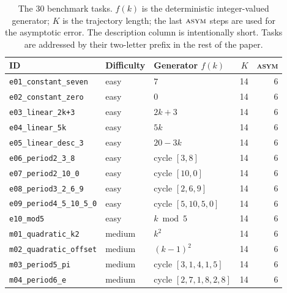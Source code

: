 \documentclass[11pt]{article}
\begin{document}
\begin{table}[t]
\centering
\caption{The 30 benchmark tasks.  $f(k)$ is the deterministic
integer-valued generator; $K$ is the trajectory length; the last
$\textsc{asym}$ steps are used for the asymptotic error.  The
description column is intentionally short.  Tasks are addressed by
their two-letter prefix in the rest of the paper.}
\label{tab:tasks}
\small
\begin{tabularx}{\linewidth}{l l X r r}
\toprule
ID & Difficulty & Generator $f(k)$ & $K$ & \textsc{asym} \\
\midrule
\texttt{e01\_constant\_seven}      & easy   & $7$                                          & 14 & 6 \\
\texttt{e02\_constant\_zero}       & easy   & $0$                                          & 14 & 6 \\
\texttt{e03\_linear\_2k+3}         & easy   & $2k + 3$                                     & 14 & 6 \\
\texttt{e04\_linear\_5k}           & easy   & $5k$                                         & 14 & 6 \\
\texttt{e05\_linear\_desc\_3}      & easy   & $20 - 3k$                                    & 14 & 6 \\
\texttt{e06\_period2\_3\_8}        & easy   & cycle $[3,8]$                                & 14 & 6 \\
\texttt{e07\_period2\_10\_0}       & easy   & cycle $[10,0]$                               & 14 & 6 \\
\texttt{e08\_period3\_2\_6\_9}     & easy   & cycle $[2,6,9]$                              & 14 & 6 \\
\texttt{e09\_period4\_5\_10\_5\_0} & easy   & cycle $[5,10,5,0]$                           & 14 & 6 \\
\texttt{e10\_mod5}                 & easy   & $k \bmod 5$                                  & 14 & 6 \\
\midrule
\texttt{m01\_quadratic\_k2}        & medium & $k^2$                                        & 14 & 6 \\
\texttt{m02\_quadratic\_offset}    & medium & $(k - 1)^2$                                  & 14 & 6 \\
\texttt{m03\_period5\_pi}          & medium & cycle $[3,1,4,1,5]$                          & 14 & 6 \\
\texttt{m04\_period6\_e}           & medium & cycle $[2,7,1,8,2,8]$                        & 14 & 6 \\

\end{tabularx}
\end{table}
\end{document}
